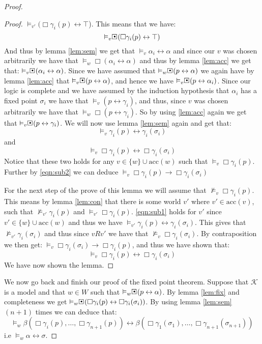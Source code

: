 \documentclass[../main.tex]{subfiles}
\begin{document}
\begin{proof}
\begin{proof}
		$\vDash_{v'}(\Box\gamma_i(p)\leftrightarrow\top$). This means
		that we have:
		\[\vDash_v\sBox(\Box\gamma_i(p)\leftrightarrow\top)\]
		And thus by lemma \ref{lem:sem} we get that
		$\vDash_v\alpha_i\leftrightarrow\alpha$ and since our $v$ was
		chosen arbitrarily we have that
		$\vDash_w\Box(\alpha_i\leftrightarrow\alpha)$ and thus by
		lemma \ref{lem:acc} we get that:
		$\vDash_v\sBox(\alpha_i\leftrightarrow\alpha)$. Since we have
		assumed that $\vDash_w\sBox(p\leftrightarrow\alpha)$ we again
		have by lemma \ref{lem:acc} that
		$\vDash_v\sBox(p\leftrightarrow\alpha)$, and hence we have
		$\vDash_v\sBox(p\leftrightarrow\alpha_i)$. Since our logic is
		complete and we have assumed by the induction hypothesis that
		$\alpha_i$ has a fixed point $\sigma_i$ we have that
		$\vDash_v(p\leftrightarrow\gamma_i)$, and thus, since $v$ was
		chosen arbitrarily we have that
		$\vDash_w\Box(p\leftrightarrow\gamma_i)$. So by using
		\ref{lem:acc} again we get that
		$\vDash_v\sBox(p\leftrightarrow\gamma_i)$. We will now use
		lemma \ref{lem:sem} again and get that:
		\begin{equation}
			\label{eqn:sub1}
			\vDash_v\gamma_i(p)\leftrightarrow\gamma_i(\sigma_i)
		\end{equation}
		and
		\begin{equation}
			\label{eqn:sub2}
			\vDash_v\Box\gamma_i(p)\leftrightarrow\Box\gamma_i(\sigma_i)
		\end{equation}
		Notice that these two holds for any $v\in\{w\}\cup\text{acc}(w)$ such that
		$\vDash_v\Box\gamma_i(p)$.
		Further by \ref{eqn:sub2} we can deduce
		$\vDash_v\Box\gamma_i(p)\rightarrow\Box\gamma_i(\sigma_i)$

		For the next step of the prove of this lemma we will assume that
		$\not\vDash_v\Box\gamma_i(p)$. This means by lemma
		\ref{lem:con} that there is some world $v'$ where
		$v'\in\text{acc}(v)$, such that $\not\vDash_{v'}\gamma_i(p)$
		and $\vDash_{v'}\Box\gamma_i(p)$. \ref{eqn:sub1} holds for $v'$
		since $v'\in\{w\}\cup\text{acc}(w)$ and thus we have
		$\vDash_{v'}\gamma_i(p)\leftrightarrow\gamma_i(\sigma_i)$. This
		gives that $\not\vDash_{v'}\gamma_i(\sigma_i)$ and thus since
		$vRv'$ we have that $\not\vDash_v\Box\gamma_i(\sigma_i)$. By
		contraposition we then get:
		$\vDash_v\Box\gamma_i(\sigma_i)\rightarrow\Box\gamma_i(p)$, and
		thus we have shown that:
		$$\vDash_v\Box\gamma_i(p)\leftrightarrow\Box\gamma_i(\sigma_i)$$
		We have now shown the lemma.
	\end{proof}
	We now go back and finish our proof of the fixed point theorem. Suppose
	that $\mathcal{K}$ is a model and that $w\in W$ such that
	$\vDash_w\sBox(p\leftrightarrow\alpha)$. By lemma \ref{lem:fix} and
	completeness we get
	$\vDash_w\sBox(\Box\gamma_i(p)\leftrightarrow\Box\gamma_i(\sigma_i))$.
	By using lemma \ref{lem:sem} $(n+1)$ times we can deduce that:
	$$\vDash_w\beta(\Box\gamma_i(p),\ldots,\Box\gamma_{n+1}(p))\leftrightarrow\beta(
	\Box\gamma_1(\sigma_1),\ldots,\Box\gamma_{n+1}(\sigma_{n+1}))$$
	i.e $\vDash_w\alpha\leftrightarrow\sigma$. 


\end{proof}
\end{document}
